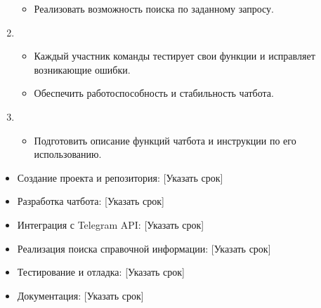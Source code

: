 \documentclass[letterpaper,10pt,russian]{sphinxmanual}
\begin{document}
\begin{enumerate}
\begin{itemize}
\item {} 
\sphinxAtStartPar
Реализовать возможность поиска по заданному запросу.

\end{itemize}

\item {} 
\sphinxAtStartPar
{}
\begin{itemize}
\item {} 
\sphinxAtStartPar
Каждый участник команды тестирует свои функции и исправляет возникающие ошибки.

\item {} 
\sphinxAtStartPar
Обеспечить работоспособность и стабильность чат\sphinxhyphen{}бота.

\end{itemize}

\item {} 
\sphinxAtStartPar
{}
\begin{itemize}
\item {} 
\sphinxAtStartPar
Подготовить описание функций чат\sphinxhyphen{}бота и инструкции по его использованию.

\end{itemize}

\end{enumerate}

\sphinxAtStartPar
{}
\begin{itemize}
\item {} 
\sphinxAtStartPar
Создание проекта и репозитория: {[}Указать срок{]}

\item {} 
\sphinxAtStartPar
Разработка чат\sphinxhyphen{}бота: {[}Указать срок{]}

\item {} 
\sphinxAtStartPar
Интеграция с Telegram API: {[}Указать срок{]}

\item {} 
\sphinxAtStartPar
Реализация поиска справочной информации: {[}Указать срок{]}

\item {} 
\sphinxAtStartPar
Тестирование и отладка: {[}Указать срок{]}

\item {} 
\sphinxAtStartPar
Документация: {[}Указать срок{]}

\end{itemize}
\end{document}

